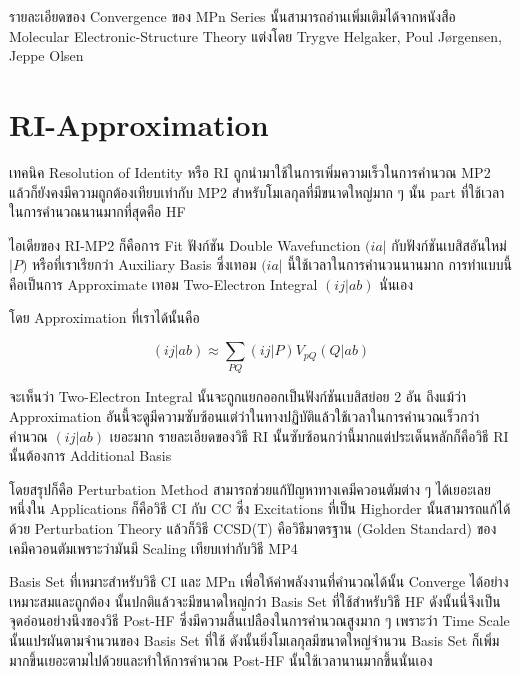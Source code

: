 รายละเอียดของ Convergence ของ MPn Series นั้นสามารถอ่านเพิ่มเติมได้จากหนังสือ
Molecular Electronic-Structure Theory แต่งโดย Trygve Helgaker, Poul Jørgensen, Jeppe Olsen

\section{RI-Approximation}

เทคนิค Resolution of Identity หรือ RI ถูกนำมาใช้ในการเพิ่มความเร็วในการคำนวณ MP2
แล้วก็ยังคงมีความถูกต้องเทียบเท่ากับ MP2 สำหรับโมเลกุลที่มีขนาดใหญ่มาก ๆ นั้น part ที่ใช้เวลาในการคำนวณนานมากที่สุดคือ
HF

ไอเดียของ RI-MP2 ก็คือการ Fit ฟังก์ชัน Double Wavefunction $(ia|$ กับฟังก์ชันเบสิสอันใหม่ $|P)$ หรือที่เราเรียกว่า
Auxiliary Basis ซึ่งเทอม $(ia|$ นี้ใช้เวลาในการคำนวนนานมาก การทำแบบนี้คือเป็นการ Approximate เทอม
Two-Electron Integral $(ij|ab)$ นั่นเอง

โดย Approximation ที่เราได้นั้นคือ

\begin{equation}
    (ij|ab) \approx \sum_{PQ} (ij|P) V_{pQ} (Q|ab)
\end{equation}

จะเห็นว่า Two-Electron Integral นั้นจะถูกแยกออกเป็นฟังก์ชันเบสิสย่อย 2 อัน ถึงแม้ว่า Approximation
อันนี้จะดูมีความซับซ้อนแต่ว่าในทางปฏิบัติแล้วใช้เวลาในการคำนวณเร็วกว่าคำนวณ $(ij|ab)$ เยอะมาก
รายละเอียดของวิธี RI นั้นซับซ้อนกว่านี้มากแต่ประเด็นหลักก็คือวิธี RI นั้นต้องการ Additional Basis

โดยสรุปก็คือ Perturbation Method สามารถช่วยแก้ปัญหาทางเคมีควอนตัมต่าง ๆ ได้เยอะเลย หนึ่งใน Applications
ก็คือวิธี CI กับ CC ซึ่ง Excitations ที่เป็น Highorder นั้นสามารถแก้ได้ด้วย Perturbation Theory
แล้วก็วิธี CCSD(T) คือวิธีมาตรฐาน (Golden Standard) ของเคมีควอนตัมเพราะว่ามันมี Scaling เทียบเท่ากับวิธี MP4

Basis Set ที่เหมาะสำหรับวิธี CI และ MPn เพื่อให้ค่าพลังงานที่คำนวณได้นั้น Converge ได้อย่างเหมาะสมและถูกต้อง%
นั้นปกติแล้วจะมีขนาดใหญ่กว่า Basis Set ที่ใช้สำหรับวิธี HF ดังนั้นนี่จึงเป็นจุดอ่อนอย่างนึงของวิธี Post-HF
ซึ่งมีความสิ้นเปลืองในการคำนวณสูงมาก ๆ เพราะว่า Time Scale นั้นแปรผันตามจำนวนของ Basis Set ที่ใช้
ดังนั้นยิ่งโมเลกุลมีขนาดใหญ่จำนวน Basis Set ก็เพิ่มมากขึ้นเยอะตามไปด้วยและทำให้การคำนวณ Post-HF
นั้นใช้เวลานานมากขึ้นนั่นเอง
